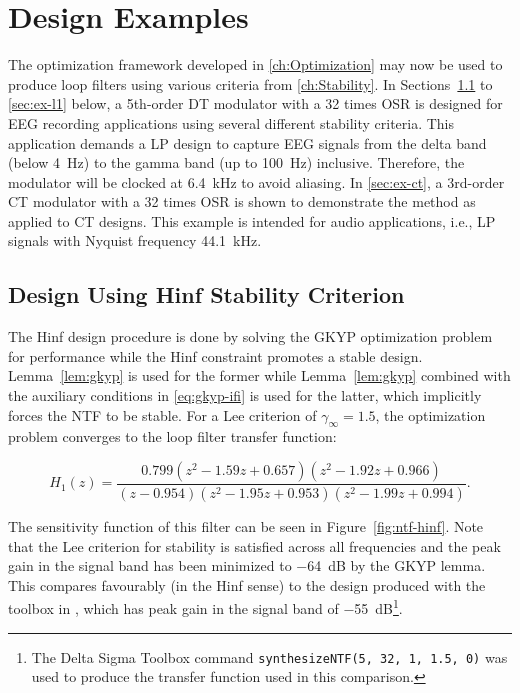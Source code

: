 
\chapter{Design Examples}
\label{ch:Examples}

The optimization framework developed in \autoref{ch:Optimization} may now be used to produce loop filters using various criteria from \autoref{ch:Stability}. In Sections~\ref{sec:ex-hinf} to \ref{sec:ex-l1} below, a 5th-order \gls{DT} modulator with a 32 times \gls{OSR} is designed for \gls{EEG} recording applications using several different stability criteria. This application demands a \gls{LP} design to capture \gls{EEG} signals from the delta band (below \SI{4}{\hertz}) to the gamma band (up to \SI{100}{\hertz}) inclusive. Therefore, the modulator will be clocked at \SI{6.4}{\kilo\hertz} to avoid aliasing. In \autoref{sec:ex-ct}, a 3rd-order \gls{CT} modulator with a 32 times \gls{OSR} is shown to demonstrate the method as applied to \gls{CT} designs. This example is intended for audio applications, i.e., \gls{LP} signals with Nyquist frequency \SI{44.1}{\kilo\hertz}.

\section{Design Using \gls{Hinf} Stability Criterion}
\label{sec:ex-hinf}

The \gls{Hinf} design procedure is done by solving the \gls{GKYP} optimization problem for performance while the \gls{Hinf} constraint promotes a stable design. Lemma~\ref{lem:gkyp} is used for the former while Lemma~\ref{lem:gkyp} combined with the auxiliary conditions in \autoref{eq:gkyp-ifi} is used for the latter, which implicitly forces the \gls{NTF} to be stable. For a Lee criterion of $\gamma_\infty = 1.5$, the optimization problem converges to the loop filter transfer function:

\begin{equation*}
	H_1(z) = \frac{0.799\left(z^2 - 1.59z + 0.657\right)\left(z^2 - 1.92z + 0.966\right)}{\left(z - 0.954\right)\left(z^2 - 1.95z + 0.953\right)\left(z^2 - 1.99z + 0.994\right)}.
\end{equation*}

The sensitivity function of this filter can be seen in Figure~\ref{fig:ntf-hinf}. Note that the Lee criterion for stability is satisfied across all frequencies and the peak gain in the signal band has been minimized to \SI{-64}{\deci\bel} by the \gls{GKYP} lemma. This compares favourably (in the \gls{Hinf} sense) to the design produced with the toolbox in \cite[Appx. B]{Schreier1997}, which has peak gain in the signal band of \SI{-55}{\deci\bel}\footnote{The Delta Sigma Toolbox command \texttt{synthesizeNTF(5,~32,~1,~1.5,~0)} was used to produce the transfer function used in this comparison.}.

